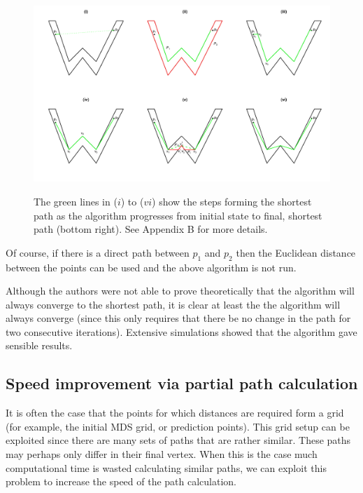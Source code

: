 \documentclass[useAMS, referee]{biom}
\begin{document}
\begin{figure}
\includegraphics[angle=90, height=\textheight,trim=0in 0.5in 0in 0.25in]{figs/wdia.pdf} \\
\label{wdia}
\caption{The green lines in ($i$) to ($vi$) show the steps forming the shortest path as the algorithm progresses from initial state to final, shortest path (bottom right). See Appendix B for more details.}
\end{figure}




Of course, if there is a direct path between $p_1$ and $p_2$ then the Euclidean distance between the points can be used and the above algorithm is not run.

Although the authors were not able to prove theoretically that the algorithm will always converge to the shortest path, it is clear at least the the algorithm will always converge (since this only requires that there be no change in the path for two consecutive iterations). Extensive simulations showed that the algorithm gave sensible results.


\subsection*{Speed improvement via partial path calculation}

It is often the case that the points for which distances are required form a grid (for example, the initial MDS grid, or prediction points). This grid setup can be exploited since there are many sets of paths that are rather similar. These paths may perhaps only differ in their final vertex. When this is the case much computational time is wasted calculating similar paths, we can exploit this problem to increase the speed of the path calculation.
\end{document}
